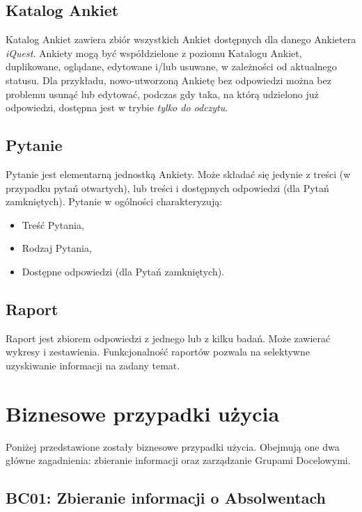 \subsection{Katalog Ankiet}
\label{Chapter234}

Katalog Ankiet zawiera zbiór wszystkich Ankiet dostępnych dla danego Ankietera \textit{iQuest}. Ankiety mogą być współdzielone z poziomu Katalogu Ankiet, duplikowane, oglądane, edytowane i\slash lub usuwane, w zależności od aktualnego statusu. Dla przykładu, nowo-utworzoną Ankietę bez odpowiedzi można bez problemu usunąć lub edytować, podczas gdy taka, na którą udzielono już odpowiedzi, dostępna jest w trybie \textit{tylko do odczytu}.

\subsection{Pytanie}
\label{Chapter235}

Pytanie jest elementarną jednostką Ankiety. Może składać się jedynie z treści (w przypadku pytań otwartych), lub treści i dostępnych odpowiedzi (dla Pytań zamkniętych). Pytanie w ogólności charakteryzują:

\begin{itemize}
\item Treść Pytania,
\item Rodzaj Pytania,
\item Dostępne odpowiedzi (dla Pytań zamkniętych).
\end{itemize}

\subsection{Raport}
\label{Chapter236}

Raport jest zbiorem odpowiedzi z jednego lub z kilku badań. Może zawierać wykresy i zestawienia. Funkcjonalność raportów pozwala na selektywne uzyskiwanie informacji na zadany temat.

\pagebreak
\section{Biznesowe przypadki użycia}
\label{Chapter24}

Poniżej przedstawione zostały biznesowe przypadki użycia. Obejmują one dwa główne zagadnienia: zbieranie informacji oraz zarządzanie Grupami Docelowymi.

\subsection{BC01: Zbieranie informacji o Absolwentach}
\label{Chapter241}

